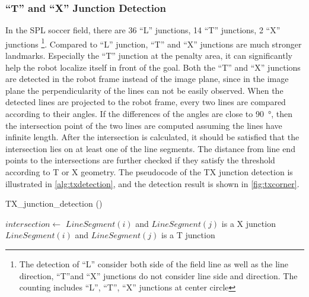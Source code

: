 \subsubsection{``T'' and ``X'' Junction Detection}
In the \gls{SPL} soccer field, there are 36 ``L'' junctions, 14 ``T'' junctions, 2 ``X'' junctions \footnote{The detection of ``L'' consider both side of the field line as well as the line direction, ``T''and ``X'' junctions do not consider line side and direction. The counting includes ``L'', ``T'', ``X'' junctions at center circle}. Compared to ``L'' junction, ``T'' and ``X'' junctions are much stronger landmarks. Especially the ``T'' junction at the penalty area, it can significantly help the robot localize itself in front of the goal.
Both the ``T'' and ``X'' junctions are detected in the robot frame instead of the image plane, since in the image plane the perpendicularity of the lines can not be easily observed. When the detected lines are projected to the robot frame, every two lines are compared according to their angles. If the differences of the angles are close to \SI{90}{\degree}, then the intersection point of the two lines are computed assuming the lines have infinite length. After the intersection is calculated, it should be satisfied that the intersection lies on at least one of the line segments. The distance from line end points to the intersections are further checked if they satisfy the threshold according to T or X geometry. The pseudocode of the TX junction detection is illustrated in \autoref{alg:txdetection}, and the detection result is shown in \autoref{fig:txcorner}.

\begin{algorithm}                      
  \caption{TX\_junction\_detection ()}         %
\label{alg:txdetection}                           
\begin{algorithmic}[1]                    
		\State $intersection \gets$ 
				\State $LineSegment(i)$ and $LineSegment(j)$ is a X junction
			\EndIf
				\State $LineSegment(i)$ and $LineSegment(j)$ is a T junction
			\EndIf
		    \EndIf
		\EndIf
	\EndFor
  \EndFor
\end{algorithmic}
\end{algorithm}

